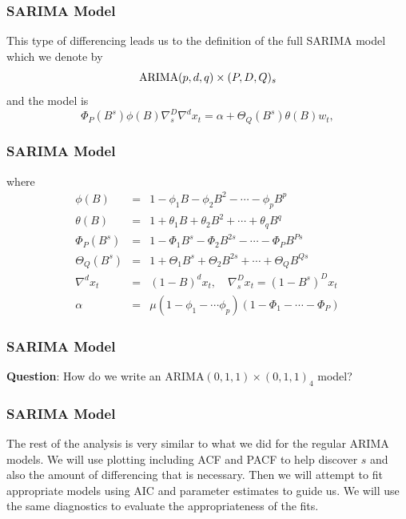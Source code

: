 \documentclass[%
xcolor=pdftex]{beamer}
\begin{document}
\begin{frame}
\frametitle{SARIMA Model}

This type of differencing leads us to the definition of the full SARIMA model which we denote by
$$
{\rm ARIMA}(p,d,q) \times (P,D,Q)_s
$$
and the model is
\begin{equation}
\Phi_{P}(B^s) \phi(B) \nabla_s^D \nabla^d x_t=\alpha + \Theta_{Q}(B^s) \theta(B) w_t,
\end{equation}

\end{frame}

\begin{frame}
\frametitle{SARIMA Model}

where
\begin{eqnarray*}
\phi(B) &=& 1-\phi_1 B - \phi_2 B^2 -\cdots - \phi_p B^p\\
\theta(B) &=& 1+\theta_1 B +\theta_2 B^2 +\cdots + \theta_q B^q\\
\Phi_{P}(B^s) &=& 1-\Phi_1 B^s - \Phi_2 B^{2s} - \cdots - \Phi_P B^{Ps}\\
\Theta_{Q}(B^s) &=& 1+\Theta_1 B^s+\Theta_2 B^{2s} +\cdots +\Theta_Q B^{Qs}\\
\nabla^d x_t &=&(1-B)^d x_{t}, \quad \nabla_s^D  x_t = (1-B^s)^Dx_t\\
\alpha &=& \mu(1 - \phi_1 - \cdots \phi_p)(1 - \Phi_1 - \cdots - \Phi_P)
\end{eqnarray*}

\end{frame}

\begin{frame}
\frametitle{SARIMA Model}

\textbf{Question}: How do we write an ARIMA$(0,1,1) \times (0,1,1)_{4}$ model?

\vspace{50mm}

\end{frame}




\begin{frame}
\frametitle{SARIMA Model}

The rest of the analysis is very similar to what we did
for the regular ARIMA models.  We will use plotting including
ACF and PACF to help discover $s$ and also the amount of
differencing that is necessary.  Then we will attempt to fit
appropriate models using AIC and parameter estimates to guide
us.  We will use the same diagnostics to evaluate the
appropriateness of the fits.

\end{frame}
\end{document}

